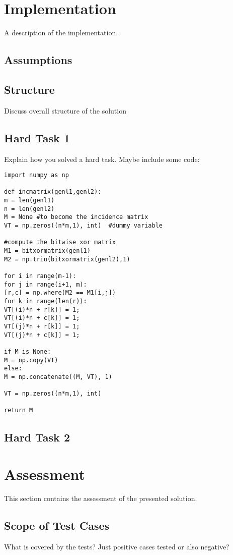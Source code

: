 \documentclass[11pt, a4paper]{article}
\begin{document}
\pagebreak
\section{Implementation}
A description of the implementation.

\subsection{Assumptions}

\subsection{Structure}
Discuss overall structure of the solution

\subsection{Hard Task 1}
Explain how you solved a hard task. Maybe include some code:

\begin{verbatim}
import numpy as np

def incmatrix(genl1,genl2):
m = len(genl1)
n = len(genl2)
M = None #to become the incidence matrix
VT = np.zeros((n*m,1), int)  #dummy variable

#compute the bitwise xor matrix
M1 = bitxormatrix(genl1)
M2 = np.triu(bitxormatrix(genl2),1)

for i in range(m-1):
for j in range(i+1, m):
[r,c] = np.where(M2 == M1[i,j])
for k in range(len(r)):
VT[(i)*n + r[k]] = 1;
VT[(i)*n + c[k]] = 1;
VT[(j)*n + r[k]] = 1;
VT[(j)*n + c[k]] = 1;

if M is None:
M = np.copy(VT)
else:
M = np.concatenate((M, VT), 1)

VT = np.zeros((n*m,1), int)

return M
\end{verbatim}

\subsection{Hard Task 2}


\pagebreak
\section{Assessment}
This section contains the assessment of the presented solution.


\subsection{Scope of Test Cases}
What is covered by the tests? Just positive cases tested or also negative?
\end{document}
